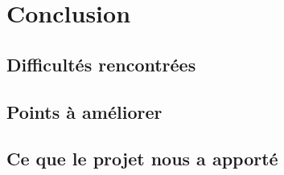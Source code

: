 \chapter{Conclusion}

\section{Difficultés rencontrées}

\section{Points à améliorer}

\section{Ce que le projet nous a apporté}